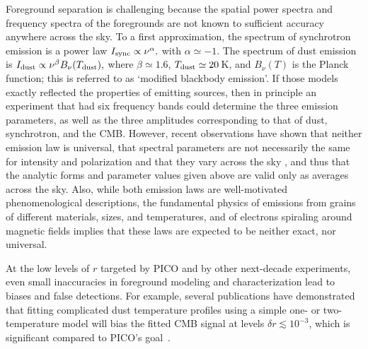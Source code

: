 \documentclass[PICOReport.tex]{subfiles}
\begin{document}
Foreground separation is challenging because the spatial power spectra and frequency spectra of the foregrounds are not known to sufficient accuracy anywhere across the sky.
To a first approximation, the spectrum of synchrotron emission is a power law $I_{\rm sync} \propto \nu^{\alpha},$ with $\alpha \simeq -1$.  The spectrum of dust emission is $I_{\rm dust} \propto \nu^{\beta} B_\nu(T_{\rm dust}),$ where $\beta \simeq 1.6$, $T_{\rm dust} \simeq 20$\,K, and $B_\nu(T)$ is the Planck function; this is referred to as `modified blackbody emission'. If those models exactly reflected the properties of emitting sources, then in principle an experiment that had six frequency bands could determine the three emission parameters, as well as the three amplitudes corresponding to that of dust, synchrotron, and the CMB. However, recent observations have shown that neither emission law is universal, that spectral parameters are not necessarily the same for intensity and polarization and that they vary across the sky \cite{SPASS_2018_variation,fuskeland2014_wmap_variation,planck_2013_xi}, and thus that the analytic forms and parameter values given above are valid only as averages across the sky. Also, while both emission laws are well-motivated phenomenological descriptions, the fundamental physics of emissions from grains of different materials, sizes, and temperatures, and of electrons spiraling around magnetic fields implies that these laws are expected to be neither exact, nor universal. 

At the low levels of $r$ targeted by PICO and by other next-decade experiments, even small inaccuracies in foreground modeling and characterization lead to biases and false detections. For example, several publications have demonstrated that fitting complicated dust temperature profiles using a simple one- or two-temperature model will bias the fitted CMB signal at levels $\delta r \lesssim 10^{-3}$, which is significant compared to PICO's goal~\citep{fantaye2011,armitage-caplan2012,kogut_fixsen2016,remazeilles/etal:2016,stompor2016}. 

\end{document}
